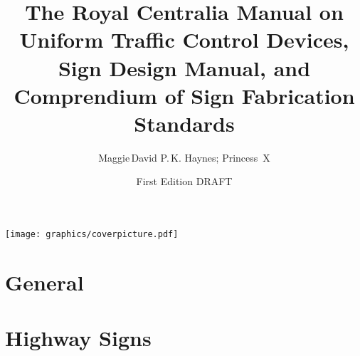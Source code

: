 \documentclass[9pt]{memoir}
\begin{document}
\title{The Royal Centralia Manual on Uniform Traffic Control Devices, Sign Design Manual, and Comprendium of Sign Fabrication Standards}
\author{Maggie\,David P.\,K. Haynes; Princess~X}
\date{First Edition DRAFT}


\maketitle

{\centering\texttt{[image: graphics/coverpicture.pdf]}\par}

\cleartorecto

\tableofcontents*






\listoffigures

\part{General}



\part{Highway Signs}




























\end{document}
